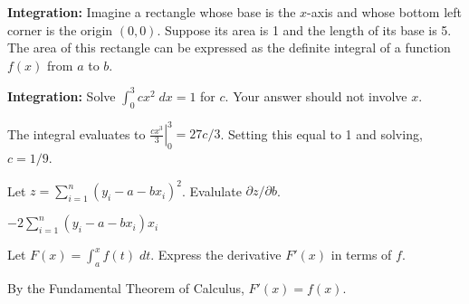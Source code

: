 \documentclass[12pt]{exam}
\begin{document}
\begin{questions}
\question \textbf{Integration:} Imagine a rectangle whose base is the $x$-axis and whose bottom left corner is the origin $(0,0)$. Suppose its area is 1 and the length of its base is 5. The area of this rectangle can be expressed as the definite integral of a function $f(x)$ from $a$ to $b$. 

\question \textbf{Integration:} Solve $\displaystyle \int_0^3 c x^2 \; dx = 1$ for $c$. Your answer should not involve $x$.
				\begin{solution}[2in]
								The integral evaluates to $\displaystyle  \left.\frac{cx^3}{3}\right|_0^3 = 27c/3$. Setting this equal to 1 and solving, $c = 1/9$.
		\end{solution}

\question Let $z = \sum_{i=1}^n (y_i - a - bx_i)^2$. Evalulate $\partial z/\partial b$.
					\begin{solution}[2in]
						$-2\sum_{i=1}^n (y_i - a - bx_i) x_i$
			\end{solution}

\question Let $\displaystyle F(x) = \int_a^x f(t) \; dt$. Express the derivative $F'(x)$ in terms of $f$.
			\begin{solution}[2in]
			By the Fundamental Theorem of Calculus, $F'(x) = f(x)$.
			\end{solution}
\end{questions}
\end{document}
